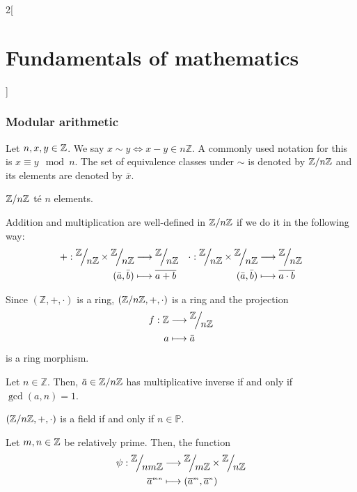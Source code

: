 \documentclass[../../../main.tex]{subfiles}
\begin{document}
\begin{multicols}{2}[\section{Fundamentals of mathematics}]
\subsubsection*{Modular arithmetic}
\begin{definition}
    Let $n,x,y\in\mathbb{Z}$. We say $x\sim y\iff x-y\in n\mathbb{Z}$. A commonly used notation for this is $x\equiv y\mod n$. The set of equivalence classes under $\sim$ is denoted by $\quot{\mathbb{Z}}{n\mathbb{Z}}$ and its elements are denoted by $\bar{x}$.
\end{definition}
\begin{lemma}
    $\quot{\ZZ}{n\ZZ}$ té $n$ elements.
\end{lemma}
\begin{prop}
    Addition and multiplication are well-defined in $\quot{\ZZ}{n\ZZ}$ if we do it in the following way:
    \begin{align*}
        +:\quot{\ZZ}{n\ZZ}\times\quot{\ZZ}{n\ZZ}&\longrightarrow\quot{\ZZ}{n\ZZ}&\cdot:\quot{\ZZ}{n\ZZ}\times\quot{\ZZ}{n\ZZ}&\longrightarrow\quot{\ZZ}{n\ZZ}\\
        (\bar{a},\bar{b})&\longmapsto\overline{a+b}&(\bar{a},\bar{b})&\longmapsto\overline{a\cdot b}
    \end{align*}
\end{prop}
\begin{theorem}
    Since $(\mathbb{Z},+,\cdot)$ is a ring, $(\quot{\ZZ}{n\ZZ},+,\cdot)$ is a ring and the projection 
    \begin{align*}
        f:\mathbb{Z}&\longrightarrow\quot{\ZZ}{n\ZZ}\\
        a&\longmapsto\bar{a}
    \end{align*}
    is a ring morphism.
\end{theorem}
\begin{lemma}
    Let $n\in\mathbb{Z}$. Then, $\bar{a}\in\quot{\ZZ}{n\ZZ}$ has multiplicative inverse if and only if $\gcd(a,n)=1$.
\end{lemma}
\begin{corollary}
    $(\quot{\ZZ}{n\ZZ},+,\cdot)$ is a field if and only if $n\in\mathbb{P}$.
\end{corollary}
\begin{theorem}
    Let $m,n\in\mathbb{Z}$ be relatively prime. Then, the function
    \begin{align*}
        \psi:\quot{\ZZ}{nm\ZZ}&\longrightarrow\quot{\ZZ}{m\ZZ}\times\quot{\ZZ}{n\ZZ}\\
        \overline{a}^{\scriptscriptstyle mn}&\longmapsto(\overline{a}^{\scriptscriptstyle m},\overline{a}^{\scriptscriptstyle n})

\end{align*}
\end{theorem}
\end{multicols}
\end{document}
